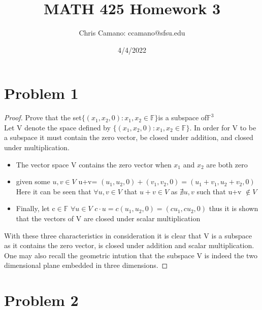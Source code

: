 \documentclass[12pt]{article}
\author{Chris Camano: ccamano@sfsu.edu}
\title{MATH 425  Homework 3 }
\date{4/4/2022}
\newcommand{\sect}[1]{\section*{#1}}
\newcommand{\F}{\mathbb{F}}
\begin{document}
\maketitle
\sect{Problem 1}
\begin{proof}
  Prove that the set$\{(x_1, x_2,0):x_1, x_2\in\F\}$is a subspace of$\F^3$\\
  Let V denote the space defined by $\{(x_1, x_2,0):x_1, x_2\in\F\}$. In order for V to be a subspace it must contain the zero vector, be closed under addition, and closed under multiplication.
  \begin{itemize}
    \item The vector space V contains the zero vector when $x_1$ and $x_2$ are both zero
    \item given some $u,v \in V$ u+v= $(u_1,u_2,0)+(v_1,v_2,0)=(u_1+v_1,u_2+v_2,0)$  Here it can be seen that $\forall u, v \in V$ that $u+v \in V$ as $\nexists u,v$ such that u+v $\notin  V$
    \item Finally, let c$\in \F$ $\forall u \in V$ $c \cdot u= c( u_1,u_2,0)=(cu_1,cu_2,0)$ thus it is shown that the vectors of V are closed under scalar multiplication
  \end{itemize}
  With these three characteristics in consideration it is clear that V is a subspace as it contains the zero vector, is closed under addition and scalar multiplication. One may also recall the geometric intution that the subspace V is indeed the two dimensional plane embedded in three dimensions.
\end{proof}
\sect{Problem 2}
\end{document}
